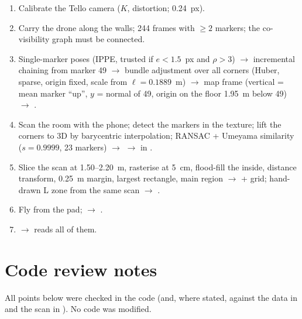 \begin{enumerate}[nosep]
\item Calibrate the Tello camera ($K$, distortion; 0.24~px).
\item Carry the drone along the walls; 244 frames with $\geq 2$ markers; the co-visibility graph must be connected.
\item Single-marker poses (IPPE, trusted if $e < 1.5$~px and $\rho > 3$) $\to$ incremental chaining from marker 49
  $\to$ bundle adjustment over all corners (Huber, sparse, origin fixed, scale from $\ell = 0.1889$~m) $\to$ map
  frame (vertical = mean marker ``up'', $y$ = normal of 49, origin on the floor 1.95~m below 49) $\to$
  .
\item Scan the room with the phone; detect the markers in the texture; lift the corners to 3D by barycentric
  interpolation; RANSAC + Umeyama similarity ($s = 0.9999$, 23 markers) $\to$  $\to$
   in .
\item Slice the scan at 1.50--2.20~m, rasterise at 5~cm, flood-fill the inside, distance transform, 0.25~m margin,
  largest rectangle, main region $\to$  + grid; hand-drawn L zone from the same scan
  $\to$ .
\item Fly from the pad;  $\to$ .
\item {} $\to$  reads all of them.
\end{enumerate}

\section{Code review notes}

All points below were checked in the code (and, where stated, against the data in  and the scan in
). No code was modified.

